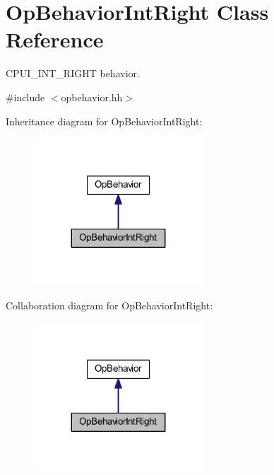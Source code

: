 \hypertarget{class_op_behavior_int_right}{}\section{Op\+Behavior\+Int\+Right Class Reference}
\label{class_op_behavior_int_right}


C\+P\+U\+I\+\_\+\+I\+N\+T\+\_\+\+R\+I\+G\+HT behavior.  




{\ttfamily \#include $<$opbehavior.\+hh$>$}



Inheritance diagram for Op\+Behavior\+Int\+Right\+:
\nopagebreak
\begin{figure}[H]
\begin{center}
\leavevmode
\includegraphics[width=179pt]{class_op_behavior_int_right__inherit__graph}
\end{center}
\end{figure}


Collaboration diagram for Op\+Behavior\+Int\+Right\+:
\nopagebreak
\begin{figure}[H]
\begin{center}
\leavevmode
\includegraphics[width=179pt]{class_op_behavior_int_right__coll__graph}
\end{center}
\end{figure}
